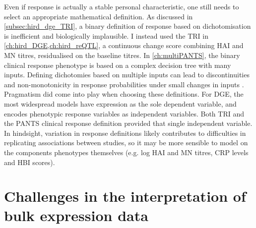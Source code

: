 Even if response is actually a stable personal characteristic, one still needs to select an appropriate mathematical definition.
As discussed in \cref{subsec:hird_dge_TRI}, a binary definition of response based on dichotomisation is inefficient and biologically implausible.
I instead used the \gls{TRI} in \cref{ch:hird_DGE,ch:hird_reQTL}, a continuous change score combining \gls{HAI} and \gls{MN} titres, residualised on the baseline titres.
In \cref{ch:multiPANTS}, the binary clinical response phenotype is based on a complex decision tree with many inputs.
Defining dichotomies based on multiple inputs can lead to discontinuities and non-monotonicity in response probabilities under small changes in inputs \autocite{senn2005DichotomaniaObsessiveCompulsive}.
Pragmatism did come into play when choosing these definitions.
For \gls{DGE}, the most widespread models have expression as the sole dependent variable, and encodes phenotypic response variables as independent variables.
Both \gls{TRI} and the \gls{PANTS} clinical response definition provided that single independent variable.
In hindsight, variation in response definitions likely contributes to difficulties in replicating associations between studies,
so it may be more sensible to model on the components phenotypes themselves (e.g. log \gls{HAI} and \gls{MN} titres, \gls{CRP} levels and \gls{HBI} scores).


\section{Challenges in the interpretation of bulk expression data}
\label{sec:discussion_bulkData}

